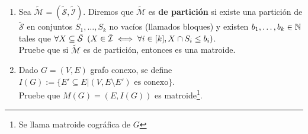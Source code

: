 \begin{enumerate}[label ={\bf P\arabic*}]
	\item Sea $\tilde{\mathcal{M}}=(\tilde{\mathcal{S}},\tilde{\mathcal{I}})$. Diremos que $\tilde{\mathcal{M}}$ es \textbf{de partición} si existe una partición de $\tilde{\mathcal{S}}$ en conjuntos $S_1, \dots , S_k$ no vacíos (llamados bloques) y existen $b_1, \dots , b_k\in\mathbb{N}$ tales que $\forall X\subseteq \tilde{\mathcal{S}}\hspace{0.5em} (X\in \tilde{\mathcal{I}}\iff \forall i\in[k], X\cap S_i \leq b_i)$.
		\\ Pruebe que si $\tilde{\mathcal{M}}$ es de partición, entonces es una matroide.

	\item Dado $G=(V,E)$ grafo conexo, se define $I(G):=\{E'\subseteq E | (V, E \setminus E') \text{ es conexo}\}$.
		\\ Pruebe que $M(G) = (E, I(G))$ es matroide\footnote{Se llama matroide cográfica de $G$}.

\end{enumerate}
